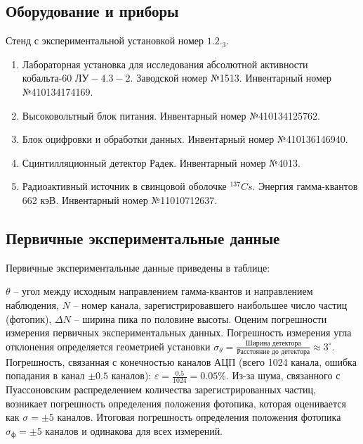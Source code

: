 \documentclass[10pt,a4paper]{article}
\begin{document}
	\subsection*{Оборудование и приборы}
		
	Стенд с экспериментальной установкой номер $1.2._3$.
	\begin{enumerate}
		\item Лабораторная установка для исследования абсолютной активности кобальта-60 $ЛУ-4.3-2$. Заводской номер №1513. Инвентарный номер №410134174169.
				
		\item Высоковольтный блок питания. Инвентарный номер №410134125762.
		
		\item Блок оцифровки и обработки данных. Инвентарный номер №410136146940.
		
		\item Сцинтилляционный детектор Радек. Инвентарный номер №4013.
				
		\item Радиоактивный источник в свинцовой оболочке ${}^{137}Cs$. Энергия гамма-квантов 662 кэВ. Инвентарный номер №11010712637.
	\end{enumerate}
	
	\subsection*{Первичные экспериментальные данные}
	
	Первичные экспериментальные данные приведены в таблице:\\
	\begin{center}
		
	\end{center}

	
	$\theta$ -- угол между исходным направлением гамма-квантов и направлением наблюдения, $N$ -- номер канала, зарегистрировавшего наибольшее число частиц (фотопик), $\Delta N$ -- ширина пика по половине высоты. Оценим погрешности измерения первичных экспериментальных данных. Погрешность измерения угла отклонения определяется геометрией установки $\sigma_\theta = \frac{\text{Ширина детектора}}{\text{Расстояние до детектора}} \approx 3^\circ$. Погрешность, связанная с конечностью каналов АЦП (всего 1024 канала, ошибка попадания в канал $\pm 0.5$ каналов): $\varepsilon = \frac{0.5}{1024} = 0.05 \%$. Из-за шума, связанного с Пуассоновским распределением количества зарегистрированных частиц, возникает погрешность определения положения фотопика, которая оценивается как $\sigma = \pm 5$ каналов. Итоговая погрешность определения положения фотопика $\sigma_ф = \pm 5$ каналов и одинакова для всех измерений.
	
\end{document}
